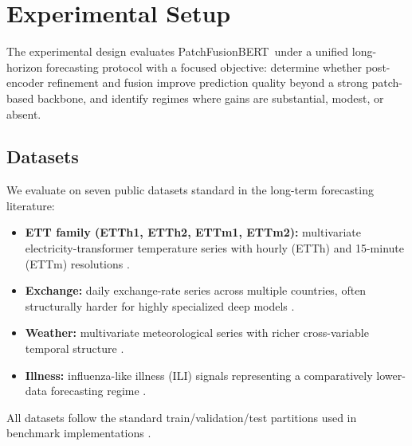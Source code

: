 \documentclass{ieeeaccess}
\newcommand{\model}{PatchFusionBERT\xspace}
\begin{document}
\section{Experimental Setup}\label{sec:experimental_setup}

The experimental design evaluates \model\ under a unified long-horizon forecasting
protocol with a focused objective: determine whether post-encoder refinement and
fusion improve prediction quality beyond a strong patch-based backbone, and identify
regimes where gains are substantial, modest, or absent.

\subsection{Datasets}
We evaluate on seven public datasets standard in the long-term forecasting literature:
\begin{itemize}
    \item \textbf{ETT family (ETTh1, ETTh2, ETTm1, ETTm2):} multivariate
    electricity-transformer temperature series with hourly (ETTh) and 15-minute
    (ETTm) resolutions \cite{zhou2021informer,wu2021autoformer}.
    \item \textbf{Exchange:} daily exchange-rate series across multiple countries,
    often structurally harder for highly specialized deep models \cite{lai2018lstnet}.
    \item \textbf{Weather:} multivariate meteorological series with richer
    cross-variable temporal structure \cite{zhou2021informer,wu2021autoformer}.
    \item \textbf{Illness:} influenza-like illness (ILI) signals representing a
    comparatively lower-data forecasting regime \cite{zhou2021informer}.
\end{itemize}
All datasets follow the standard train/validation/test partitions used in benchmark
implementations \cite{zhou2021informer,wu2021autoformer}.
\end{document}

